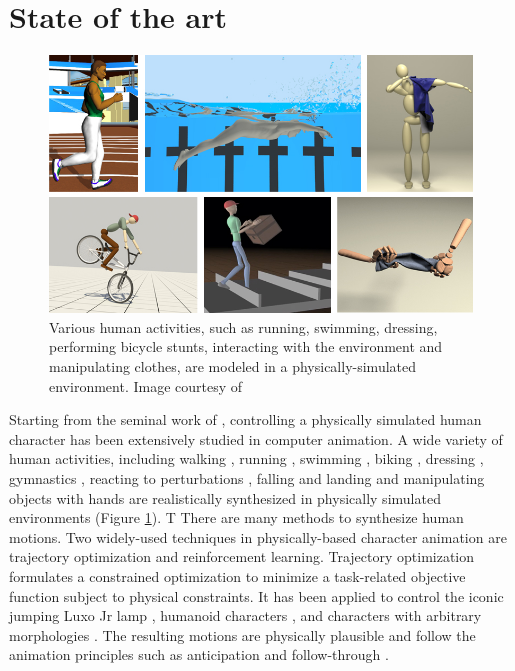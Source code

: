 \section{State of the art}

\begin{figure}[h]
  \centering
  \includegraphics[width=\textwidth]{figures/teaser2.jpg}
  \caption{Various human activities, such as running, swimming, dressing, performing bicycle stunts, interacting with the environment and manipulating clothes, are modeled in a physically-simulated environment. Image courtesy of \cite{Hodgins:1995:AHA,Si:2014,Clegg:2015,Tan:2014,Coros2010,Bai:2014}}
  \label{fig:teaser}
\end{figure}

Starting from the seminal work of \citet{Hodgins:1995:AHA}, controlling a physically simulated human character has been extensively studied in computer animation. A wide variety of human activities, including walking \cite{Yin:2007}, running \cite{Kwon:2010}, swimming \cite{kwatra2009fluid,Si:2014}, biking \cite{Tan:2014}, dressing \cite{Clegg:2015}, gymnastics \cite{Hodgins:1995:AHA}, reacting to perturbations \cite{Wang:2010}, falling and landing \cite{HA:2012:FLM} and manipulating objects with hands \cite{Liu:2009:DMF,Ye:2012,Bai:2014} are realistically synthesized in physically simulated environments (Figure \ref{fig:teaser}). 
T
There are many methods to synthesize human motions. Two widely-used techniques in physically-based character animation are trajectory optimization and reinforcement learning. Trajectory optimization formulates a constrained optimization to minimize a task-related objective function subject to physical constraints. It has been applied to control the iconic jumping Luxo Jr lamp \cite{Witkin:1988}, humanoid characters \cite{Liu:2002,Jain:2009,Ye:2010}, and characters with arbitrary morphologies \cite{Wampler:2009}. The resulting motions are physically plausible and follow the animation principles such as anticipation and follow-through \cite{thomas:1995}.

